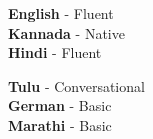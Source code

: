 \documentclass[9pt]{developercv} %
\begin{document}
    \vspace{-6pt}
    \hspace{26mm}
    \begin{minipage}[t]{0.3\textwidth}
            \textbf{English} - Fluent\\
            \textbf{Kannada} - Native\\
            \textbf{Hindi} - Fluent\\
    \end{minipage}
    \begin{minipage}[t]{0.5\textwidth}
            \textbf{Tulu} - Conversational\\
            \textbf{German} - Basic\\
            \textbf{Marathi} - Basic\\
            \\
    \end{minipage}
\end{document}
